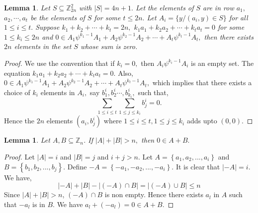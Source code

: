 \documentclass[reqno,10pt]{amsart}
\newtheorem{lem}[prop]{ Lemma}
\begin{document}
\begin{lem}Let $S \subseteq \mathbb{Z}_{2n}^2$ with $|S| = 4n+1.$ Let the elements of $S$ are in row $a_1,$ $a_2, \cdots, a_{t}$ be the elements of $S$ for some $t \leq 2n.$  Let $A_i = \{ y / (a_i,y) \in S \}$ for all $1\leq i \leq t.$
Suppose $k_1+ k_2 +\cdots+k_{t}=2n,$ $k_1 a_1 + k_2 a_2+ \cdots + k_t a_t = 0$ for some $1\leq k_i \leq 2n$ and $0 \in A_1 {\psi}^{k_1-1}A_1+
A_2 {\psi}^{k_2-1} A_2+ \cdots + A_{t} {\psi}^{k_{t}-1 } A_{t},$  then
there exists $2n$ elements in the set $S$ whose sum is zero.
\end{lem}
\begin{proof}
We use the convention that if $k_i =0,$ then $A_i {\psi}^{{k_i}-1} A_i$ is an empty set. The equation $k_1 a_1 + k_2 a_2+ \cdots + k_{t}a_t = 0.$
Also, $0 \in A_1 {\psi}^{k_1-1}A_1+A_2 {\psi}^{k_2-1} A_2+ \cdots + A_{t} {\psi}^{k_{t} -1 } A_{t},$ which implies that there exists a choice of $k_i$ elements in $A_i,$ say $b_1^i, b_2^i \cdots, b_{k_i}^i,$ such that, $$ \sum_{1 \leq i \leq {t}}  \sum_{1 \leq j \leq {k_i}} b_{j}^i = 0.$$ 
Hence the $2n$ elements $(a_i, b_j^i)$ where $1\leq i \leq t, 1 \leq j \leq {k_i} $ adds upto $(0,0).$
\end{proof}
\begin{lem}\label{main}
 Let $A,B \subseteq \mathbb{Z}_n$. If $|A|+|B| > n,$ then $0 \in A+B.$ 
\end{lem}
\begin{proof}
 Let $|A| = i$ and $|B|=j$ and $i+j >n .$ Let $A = \left\lbrace a_1,a_2,...,a_i \right\rbrace $ and $B = \left\lbrace b_1,b_2,...,b_j \right\rbrace $. Define $ -A = \left\lbrace -a_1,-a_2,...,-a_i \right\rbrace $. It is clear that $|-A|=i$. We have,
 $$ |-A|+|B|-|(-A) \cap B| = |(-A) \cup B| \leq n $$
 Since $|A|+|B| > n $, $(-A) \cap B$ is non empty.  Hence there exists $a_l$ in $A$ such that $-a_l$ is in $B$. We have $ a_l+(-a_l) = 0 \in A+B .$
 \end{proof}
\end{document}
